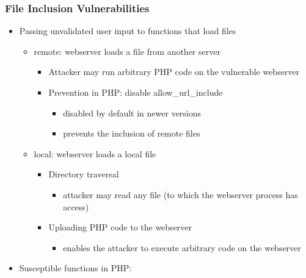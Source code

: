 \documentclass[final]{article}
\begin{document}
\subsubsection*{File Inclusion Vulnerabilities}
\begin{itemize}[nosep]
    \item Passing unvalidated user input to functions that load files
          \begin{itemize}[nosep]
              \item remote: webserver loads a file from another server
                    \begin{itemize}[nosep]
                        \item Attacker may run arbitrary PHP code on the vulnerable webserver
                        \item Prevention in PHP: disable allow\_url\_include
                              \begin{itemize}[nosep]
                                  \item disabled by default in newer versions
                                  \item prevents the inclusion of remote files
                              \end{itemize}
                    \end{itemize}
              \item local: webserver loads a local file
                    \begin{itemize}[nosep]
                        \item Directory traversal
                              \begin{itemize}[nosep]
                                  \item attacker may read any file (to which the webserver process has access)
                              \end{itemize}
                        \item Uploading PHP code to the webserver
                              \begin{itemize}[nosep]
                                  \item enables the attacker to execute arbitrary code on the webserver
                              \end{itemize}
                    \end{itemize}
          \end{itemize}
    \item Susceptible functions in PHP:

\end{itemize}
\end{document}
